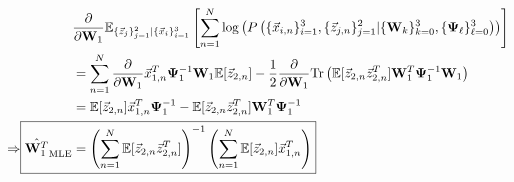 \begin{align*}
  &\frac{\partial} {\partial \W_1} \ecll \\
  &= \sum_{n=1}^N \frac{\partial}{\partial \W_1} \x_{1,n}^T \bpsi_1^{-1} \W_1 \ev
    [\z_{2,n}] - \frac{1}{2} \frac{\partial}{\partial \W_1} \Tr \left( \ev
    [\z_{2,n} \z_{2,n}^T] \W_1^T \bpsi_1^{-1} \W_1 \right)\\
  &= \ev[\z_{2,n}] \x_{1,n}^T \bpsi_1^{-1} - \ev [ \z_{2,n} \z_{2,n}^T] \W_1^T
    \bpsi_1^{-1} \\
    \Rightarrow \Aboxed{ \hat{ \W_1^T }_{\text{MLE}} &= \left(
                                                       \sum_{n=1}^N
                                                       \ev [ \z_{2,n}
                                                       \z_{2,n}^T]
                                                       \right)^{-1}
                                                       \left(
                                                       \sum_{n=1}^N \ev [ \z_{2,n}]
      \x_{1,n}^T  \right)}
\end{align*}

